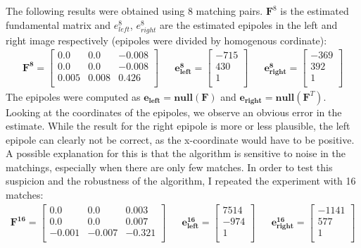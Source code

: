 \documentclass{paper}
\begin{document}
The following results were obtained using 8 matching pairs. $\mathbf{F}^{8}$ is the estimated fundamental matrix and $e^{8}_{left}$, $e^{8}_{right}$ are the estimated epipoles in the left and right image respectively (epipoles were divided by homogenous cordinate):
\begin{align}
\mathbf{F^{8}}= \left[ \begin{array}{ccc}
0.0 & 0.0 & -0.008\\
0.0 & 0.0 & -0.008 \\
0.005 & 0.008 & 0.426 \\
\end{array} \right] \nonumber 
&& \mathbf{e^{8}_{left}}=\left[ \begin{array}{c}
-715 \\
430 \\
1\\
\end{array} \right] \nonumber 
&& \mathbf{e^{8}_{right}}=\left[ \begin{array}{c}
-369 \\
392 \\
1\\
\end{array} \right] \nonumber 
\end{align}
The epipoles were computed as $\mathbf{e_{left}}=\mathbf{null}(\mathbf{F})$ and $\mathbf{e_{right}}=\mathbf{null}(\mathbf{F}^T)$.
Looking at the coordinates of the epipoles, we observe an obvious error in the estimate. While the result for  the right epipole is more or less plausible, the left epipole can clearly not be correct, as the x-coordinate would have to be positive. A possible explanation for this is that the algorithm is sensitive to noise in the matchings, especially when there are only few matches. In order to test this suspicion and the robustness of the algorithm, I repeated the experiment with 16 matches: 
\begin{align}
\mathbf{F^{16}}= \left[ \begin{array}{ccc}
0.0 & 0.0 & 0.003\\
0.0 & 0.0 & 0.007 \\
-0.001 & -0.007 & -0.321 \\
\end{array} \right] \nonumber 
&& \mathbf{e^{16}_{left}}=\left[ \begin{array}{c}
7514 \\
-974 \\
1\\
\end{array} \right] \nonumber 
&& \mathbf{e^{16}_{right}}=\left[ \begin{array}{c}
-1141 \\
577 \\
1\\
\end{array} \right] \nonumber 
\end{align}
\end{document}

